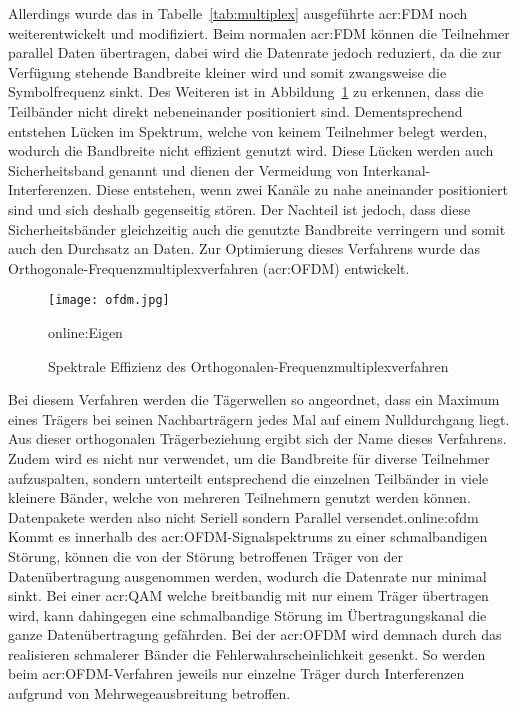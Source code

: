 Allerdings wurde das in Tabelle~\ref{tab:multiplex} ausgeführte \gls{acr:FDM} noch weiterentwickelt und modifiziert. Beim normalen \gls{acr:FDM} können die Teilnehmer parallel Daten übertragen, dabei wird die Datenrate jedoch reduziert, da die zur Verfügung stehende Bandbreite kleiner wird und somit zwangsweise die Symbolfrequenz sinkt. Des Weiteren ist in Abbildung~\ref{fig:ofdm} zu erkennen, dass die Teilbänder nicht direkt nebeneinander positioniert sind. Dementsprechend entstehen Lücken im Spektrum, welche von keinem Teilnehmer belegt werden, wodurch die Bandbreite nicht effizient genutzt wird. Diese Lücken werden auch Sicherheitsband genannt und dienen der Vermeidung von Interkanal-Interferenzen. Diese entstehen, wenn zwei Kanäle zu nahe aneinander positioniert sind und sich deshalb gegenseitig stören. Der Nachteil ist jedoch, dass diese Sicherheitsbänder gleichzeitig auch die genutzte Bandbreite verringern und somit auch den Durchsatz an Daten. Zur Optimierung dieses Verfahrens wurde das Orthogonale-Frequenzmultiplexverfahren (\gls{acr:OFDM}) entwickelt.

\begin{figure}[h]
	\centering
	\texttt{[image: ofdm.jpg]}
	\caption[Spektrale Effizienz des Orthogonalen-Frequenzmultiplexverfahren]{Spektrale Effizienz des Orthogonalen-Frequenzmultiplexverfahren} 
	\gls{online:Eigen}
	\label{fig:ofdm}
\end{figure}

Bei diesem Verfahren werden die Tägerwellen so angeordnet, dass ein Maximum eines Trägers bei seinen Nachbarträgern jedes Mal auf einem Nulldurchgang liegt. Aus dieser orthogonalen Trägerbeziehung ergibt sich der Name dieses Verfahrens. Zudem wird es nicht nur verwendet, um die Bandbreite für diverse Teilnehmer aufzuspalten, sondern unterteilt entsprechend die einzelnen Teilbänder in viele kleinere Bänder, welche von mehreren Teilnehmern genutzt werden können. Datenpakete werden also nicht Seriell sondern Parallel versendet.\gls{online:ofdm} Kommt es innerhalb des \gls{acr:OFDM}-Signalspektrums zu einer schmalbandigen Störung, können die von der Störung betroffenen Träger von der Datenübertragung ausgenommen werden, wodurch die Datenrate nur minimal sinkt. Bei einer \gls{acr:QAM} welche breitbandig mit nur einem Träger übertragen wird, kann dahingegen eine schmalbandige Störung im Übertragungskanal die ganze Datenübertragung gefährden.\cite{butlerWirelessNetworkingDeveloping2013} Bei der \gls{acr:OFDM} wird demnach durch das realisieren schmalerer Bänder die Fehlerwahrscheinlichkeit gesenkt. So werden beim \gls{acr:OFDM}-Verfahren jeweils nur einzelne Träger durch Interferenzen aufgrund von Mehrwegeausbreitung betroffen.\cite{NT}

